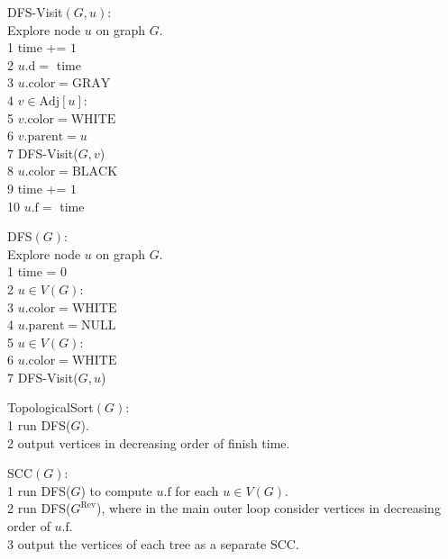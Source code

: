 \begin{code}
        DFS-Visit$(G,u)$:\\
        Explore node $u$ on graph $G$.\\
        1 \> time += $1$\\
        2 \> $u.\mathrm{d} =$ time \\ 
        3 \> $u.\mathrm{color}=\mathrm{GRAY}$ \\
        4 \> \For $v \in \mathrm{Adj}[u]$:\\
        5 \> \> \If $v.\mathrm{color}=\mathrm{WHITE}$ \Then\\
        6 \> \> \> $v.\mathrm{parent}= u$ \\
        7 \> \> \> DFS-Visit($G,v$) \\
        8 \> $u.\mathrm{color}=\mathrm{BLACK}$ \\
        9 \> time += $1$ \\
        10 \> $u.\mathrm{f} =$ time
\end{code}
\begin{code}
    DFS$(G)$:\\
    Explore node $u$ on graph $G$.\\
    1 \> time = $0$\\
    2 \> \For $u \in V(G)$:\\
    3 \> \> $u.\mathrm{color}=\mathrm{WHITE}$ \\
    4 \> \> $u.\mathrm{parent}=\mathrm{NULL}$ \\
    5 \> \For $u \in V(G)$:\\
    6 \> \> \If $u.\mathrm{color}=\mathrm{WHITE}$ \Then\\
    7 \> \> \> DFS-Visit($G,u$)
\end{code}
\begin{code}
    TopologicalSort$(G)$:\\
    1 \> run DFS($G$).\\
    2 \> output vertices in decreasing order of finish time.
\end{code}
\begin{code}
    SCC$(G)$:\\
    1 \> run DFS($G$) to compute $u.\mathrm{f}$ for each $u \in V(G)$.\\
    2 \> run DFS($G^{\text{Rev}}$), where in the main outer loop consider vertices in decreasing order of $u.\mathrm{f}$.\\
    3 \> output the vertices of each tree as a separate SCC.
\end{code}